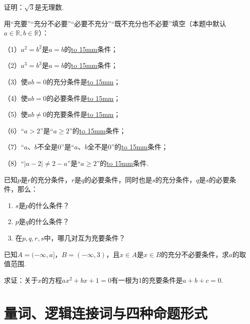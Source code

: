 \documentclass[lang=cn,math=cm,chinesefont=nofont,11pt,scheme=chinese,twocol]{elegantbook}
\begin{document}
\begin{exercise}\label{202407081520}
  证明：$\sqrt{3}$是无理数.
\end{exercise}

\begin{exercise}\label{BJ4Z_Algebra1_P28.2}
  用“充要”“充分不必要”“必要不充分”“既不充分也不必要”填空（本题中默认$a\in\mathbb{R},b\in\mathbb{R}$）：

  （1）$a^2=b^2$是$a=b$的\underline{\hbox to 15mm{}}条件；

  （2）$a^3=b^3$是$a=b$的\underline{\hbox to 15mm{}}条件；

  （3）使$ab=0$的充分条件是\underline{\hbox to 15mm{}}；

  （4）使$ab=0$的必要条件是\underline{\hbox to 15mm{}}；

  （5）使$ab\neq 0$的充要条件是\underline{\hbox to 15mm{}}；

  （6）“$a>2$”是“$a\geqslant2$”的\underline{\hbox to 15mm{}}条件；

  （7）“$a、b$不全是0”是“$a、b$全不是0”的\underline{\hbox to 15mm{}}条件；

  （8）“$\vert a-2\vert\neq2-a$”是“$a\geqslant2$”的\underline{\hbox to 15mm{}}条件.
\end{exercise}

\begin{exercise}\label{2017_XJ_bx1_P23.8}
  已知$p$是$r$的充分条件，$r$是$q$的必要条件，同时也是$s$的充分条件，$q$是$s$的必要条件，那么：
\end{exercise}

\begin{enumerate}
  \item $s$是$p$的什么条件？
  \item $p$是$q$的什么条件？
  \item 在$p,q,r,s$中，哪几对互为充要条件？
\end{enumerate}

\begin{exercise}\label{2017_RJB_bx1_P36.B5}
  已知$A=(-\infty,a]$，$B=(-\infty,3)$，且$x\in A$是$x\in B$的充分不必要条件，求$a$的取值范围.
\end{exercise}

\begin{exercise}\label{zhw2000_g1_P51.78}
  求证：关于$x$的方程$ax^2+bx+1=0$有一根为1的充要条件是$a+b+c=0$.
\end{exercise}

\section{量词、逻辑连接词与四种命题形式}
\end{document}
